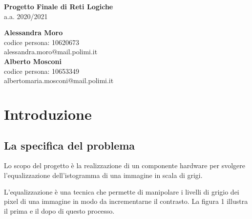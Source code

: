\documentclass[11pt]{article}
\begin{document}
\begin{titlepage}
    
    \vspace*{2cm}
    
    \begin{center}
        \huge{\bfseries Progetto Finale di Reti Logiche} \\[10pt]
        \large{a.a. 2020/2021} \\
    \end{center}
    
    \vfill
    
    \begin{flushleft}
        \large
        \textbf{Alessandra Moro} \\
        \normalsize
        codice persona: 10620673 \\ 
        alessandra.moro@mail.polimi.it \\[5mm]
        
        \large
        \textbf{Alberto Mosconi} \\
        \normalsize
        codice persona: 10653349 \\
        albertomaria.mosconi@mail.polimi.it
    \end{flushleft}
    
\end{titlepage}

\thispagestyle{empty}
\tableofcontents
\newpage

\setcounter{page}{1}
\section{Introduzione}

    \subsection{La specifica del problema}

    Lo scopo del progetto è la realizzazione di un componente hardware per svolgere l'equalizzazione dell'istogramma di una immagine in scala di grigi.
    
    L'equalizzazione è una tecnica che permette di manipolare i livelli di grigio dei pixel di una immagine in modo da incrementarne il contrasto. La figura 1 illustra il prima e il dopo di questo processo.
    
\end{document}
